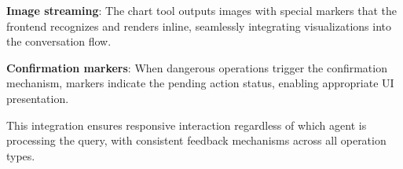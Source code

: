 \textbf{Image streaming}: The chart tool outputs images with special markers that the frontend recognizes and renders inline, seamlessly integrating visualizations into the conversation flow.

\textbf{Confirmation markers}: When dangerous operations trigger the confirmation mechanism, markers indicate the pending action status, enabling appropriate UI presentation.

This integration ensures responsive interaction regardless of which agent is processing the query, with consistent feedback mechanisms across all operation types.
